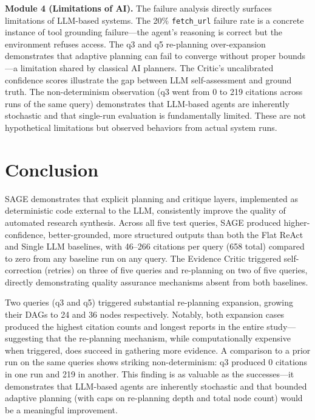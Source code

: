 \documentclass[11pt]{article}
\begin{document}
\textbf{Module 4 (Limitations of AI).} The failure analysis directly surfaces limitations of LLM-based systems. The 20\% \texttt{fetch\_url} failure rate is a concrete instance of tool grounding failure---the agent's reasoning is correct but the environment refuses access. The q3 and q5 re-planning over-expansion demonstrates that adaptive planning can fail to converge without proper bounds---a limitation shared by classical AI planners. The Critic's uncalibrated confidence scores illustrate the gap between LLM self-assessment and ground truth. The non-determinism observation (q3 went from 0 to 219 citations across runs of the same query) demonstrates that LLM-based agents are inherently stochastic and that single-run evaluation is fundamentally limited. These are not hypothetical limitations but observed behaviors from actual system runs.

\section{Conclusion}

SAGE demonstrates that explicit planning and critique layers, implemented as deterministic code external to the LLM, consistently improve the quality of automated research synthesis. Across all five test queries, SAGE produced higher-confidence, better-grounded, more structured outputs than both the Flat ReAct and Single LLM baselines, with 46--266 citations per query (658 total) compared to zero from any baseline run on any query. The Evidence Critic triggered self-correction (retries) on three of five queries and re-planning on two of five queries, directly demonstrating quality assurance mechanisms absent from both baselines.

Two queries (q3 and q5) triggered substantial re-planning expansion, growing their DAGs to 24 and 36 nodes respectively. Notably, both expansion cases produced the highest citation counts and longest reports in the entire study---suggesting that the re-planning mechanism, while computationally expensive when triggered, does succeed in gathering more evidence. A comparison to a prior run on the same queries shows striking non-determinism: q3 produced 0 citations in one run and 219 in another. This finding is as valuable as the successes---it demonstrates that LLM-based agents are inherently stochastic and that bounded adaptive planning (with caps on re-planning depth and total node count) would be a meaningful improvement.
\end{document}

